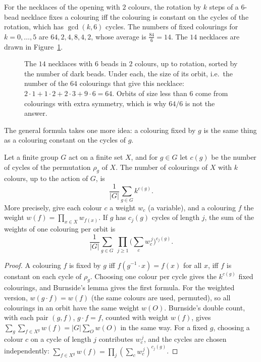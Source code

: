 For the necklaces of the opening with $2$ colours, the rotation by $k$ steps of a $6$-bead necklace fixes a colouring iff the colouring is constant on the cycles of the rotation, which has $\gcd(k,6)$ cycles. The numbers of fixed colourings for $k=0,\dots,5$ are $64,2,4,8,4,2$, whose average is $\frac{84}6=14$. The $14$ necklaces are drawn in Figure~\ref{fig:necklaces}.

\begin{figure}[ht]
\centering
{}
\caption{The $14$ necklaces with $6$ beads in $2$ colours, up to rotation, sorted by the number of dark beads. Under each, the size of its orbit, i.e.\ the number of the $64$ colourings that give this necklace: $2\cdot1+1\cdot2+2\cdot3+9\cdot6=64$. Orbits of size less than $6$ come from colourings with extra symmetry, which is why $64/6$ is not the answer.}
\label{fig:necklaces}
\end{figure}

The general formula takes one more idea: a colouring fixed by $g$ is the same thing as a colouring constant on the cycles of $g$.

\begin{theorem}\label{thm:polya}
Let a finite group $G$ act on a finite set $X$, and for $g\in G$ let $c(g)$ be the number of cycles of the permutation $\rho_g$ of $X$. The number of colourings of $X$ with $k$ colours, up to the action of $G$, is
\[
\frac1{|G|}\sum_{g\in G}k^{c(g)}.
\]
More precisely, give each colour $c$ a weight $w_c$ (a variable), and a colouring $f$ the weight $w(f)=\prod_{x\in X}w_{f(x)}$. If $g$ has $c_j(g)$ cycles of length $j$, the sum of the weights of one colouring per orbit is
\[
\frac1{|G|}\sum_{g\in G}\ \prod_{j\ge1}\Big(\sum_{c}w_c^{\,j}\Big)^{c_j(g)}.
\]
\end{theorem}
\begin{proof}
A colouring $f$ is fixed by $g$ iff $f(g^{-1}\cdot x)=f(x)$ for all $x$, iff $f$ is constant on each cycle of $\rho_g$. Choosing one colour per cycle gives the $k^{c(g)}$ fixed colourings, and Burnside's lemma gives the first formula.
For the weighted version, $w(g\cdot f)=w(f)$ (the same colours are used, permuted), so all colourings in an orbit have the same weight $w(O)$. Burnside's double count, with each pair $(g,f)$, $g\cdot f=f$, counted with weight $w(f)$, gives $\sum_g\sum_{f\in X^g}w(f)=|G|\sum_Ow(O)$ in the same way. For a fixed $g$, choosing a colour $c$ on a cycle of length $j$ contributes $w_c^{\,j}$, and the cycles are chosen independently: $\sum_{f\in X^g}w(f)=\prod_j\left(\sum_cw_c^{\,j}\right)^{c_j(g)}$.
\end{proof}

